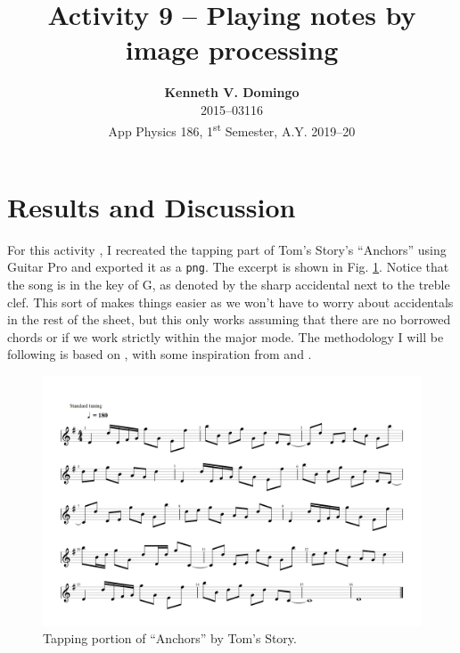 \documentclass[12pt,a4paper]{article}
\newcommand{\activity}{Activity 9 -- Playing notes by image processing}
\begin{document}
\title{\TitleFont \activity}
\author[ ]{\textbf{Kenneth V. Domingo} \\
2015--03116 \\
App Physics 186, 1\textsuperscript{st} Semester, A.Y. 2019--20}

\maketitle
\thispagestyle{titlestyle}

\section*{Results and Discussion}
\setcounter{section}{1}
For this activity \cite{soriano}, I recreated the tapping part of Tom's Story's ``Anchors'' using Guitar Pro and exported it as a \texttt{png}. The excerpt is shown in Fig. \ref{fig:anchors1}. Notice that the song is in the key of G, as denoted by the sharp accidental next to the treble clef. This sort of makes things easier as we won't have to worry about accidentals in the rest of the sheet, but this only works assuming that there are no borrowed chords or if we work strictly within the major mode. The methodology I will be following is based on \cite{harris}, with some inspiration from \cite{romero} and \cite{medrana}.

\begin{figure}[htb]
	\centering
	\includegraphics[width=\textwidth]{anc_truncated.png}
	\caption{Tapping portion of ``Anchors'' by Tom's Story.}
	\label{fig:anchors1}
\end{figure}
\end{document}
